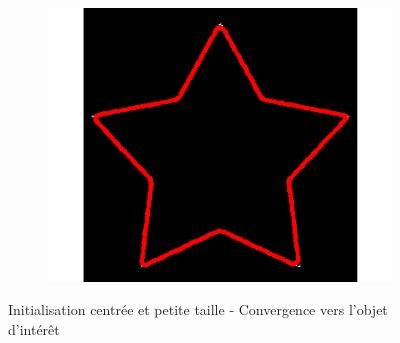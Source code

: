 \begin{appendices}
\begin{figure}[H]
\begin{subfigure}[c]{0.3\linewidth}
\includegraphics[width=\textwidth]{Chapters/Images/Init/vfccs3}
\caption{}
\end{subfigure}
\caption{Initialisation centrée et petite taille - Convergence vers l'objet d'intérêt}
\end{figure}


\end{appendices}
